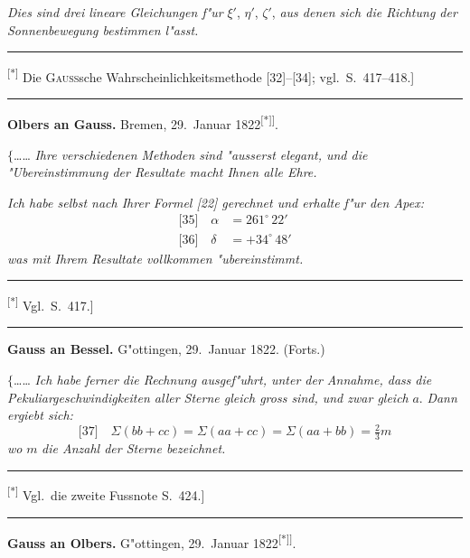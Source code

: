 \documentclass[12pt,a4paper]{article}
\theoremstyle{plain}
\theoremstyle{definition}
\theoremstyle{remark}
\begin{document}
{\itshape Dies sind drei lineare Gleichungen f"ur} $\xi'$, $\eta'$, $\zeta'$, {\itshape aus denen sich die Richtung der Sonnenbewegung bestimmen l"asst.}

\rule{\textwidth}{0.4pt}
{\small
\textsuperscript{[*]} Die \textsc{Gau\ss}sche Wahrscheinlichkeitsmethode [32]--[34]; vgl.\ S.\ 417--418.]
}
\rule{\textwidth}{0.4pt}

\vspace{1em}
\begin{center}
\textbf{Olbers an Gauss.} \quad Bremen, 29.\ Januar 1822\textsuperscript{[*]]}.
\end{center}

\noindent
$\{$\ldots{}\ldots{} {\itshape Ihre verschiedenen Methoden sind "ausserst elegant, und die} \\ {\itshape "Ubereinstimmung der Resultate macht Ihnen alle Ehre.}

{\itshape Ich habe selbst nach Ihrer Formel [22] gerechnet und erhalte f"ur den Apex:}
\begin{align*}
\text{[35]}\quad \alpha &= 261^{\circ}\,22'\\
\text{[36]}\quad \delta &= +34^{\circ}\,48'
\end{align*}
{\itshape was mit Ihrem Resultate vollkommen "ubereinstimmt.}

\rule{\textwidth}{0.4pt}
{\small
\textsuperscript{[*]} Vgl.\ S.\ 417.]
}
\rule{\textwidth}{0.4pt}

\vspace{1em}
\begin{center}
\textbf{Gauss an Bessel.} \quad G"ottingen, 29.\ Januar 1822. (Forts.)
\end{center}

\noindent
$\{$\ldots{}\ldots{} {\itshape Ich habe ferner die Rechnung ausgef"uhrt, unter der Annahme, dass} {\itshape die Pekuliargeschwindigkeiten aller Sterne gleich gross sind, und zwar gleich} $a$. {\itshape Dann ergiebt sich:}
\[
\text{[37]}\quad \Sigma(bb + cc) = \Sigma(aa + cc) = \Sigma(aa + bb) = \tfrac{2}{3}m
\]
{\itshape wo} $m$ {\itshape die Anzahl der Sterne bezeichnet.}

\rule{\textwidth}{0.4pt}
{\small
\textsuperscript{[*]} Vgl.\ die zweite Fussnote S.\ 424.]
}
\rule{\textwidth}{0.4pt}

\vspace{1em}
\begin{center}
\textbf{Gauss an Olbers.} \quad G"ottingen, 29.\ Januar 1822\textsuperscript{[*]]}.
\end{center}
\end{document}
